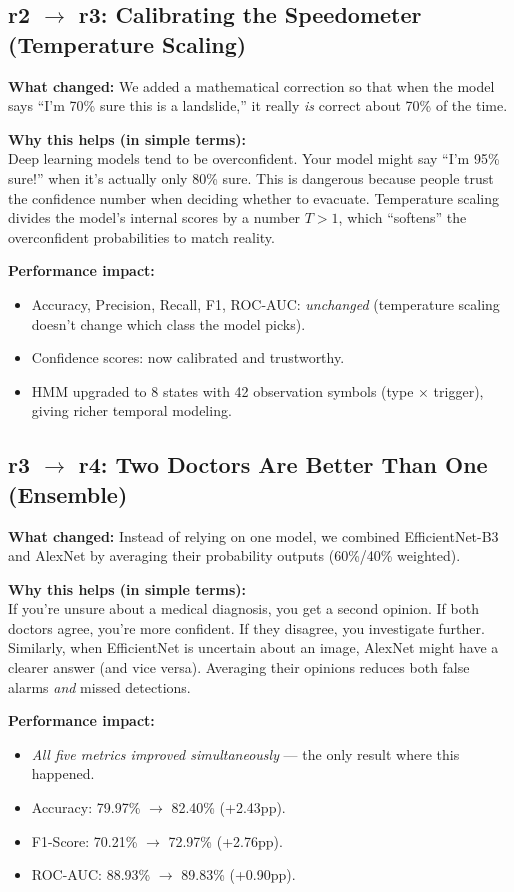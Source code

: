 \documentclass[11pt]{article}
\begin{document}
\subsection{r2 $\to$ r3: Calibrating the Speedometer (Temperature Scaling)}

\textbf{What changed:} We added a mathematical correction so that when the model says ``I'm 70\% sure this is a landslide,'' it really \emph{is} correct about 70\% of the time.

\textbf{Why this helps (in simple terms):}\\
Deep learning models tend to be overconfident. Your model might say ``I'm 95\% sure!'' when it's actually only 80\% sure. This is dangerous because people trust the confidence number when deciding whether to evacuate. Temperature scaling divides the model's internal scores by a number $T > 1$, which ``softens'' the overconfident probabilities to match reality.

\textbf{Performance impact:}
\begin{itemize}[nosep]
    \item Accuracy, Precision, Recall, F1, ROC-AUC: \emph{unchanged} (temperature scaling doesn't change which class the model picks).
    \item Confidence scores: now calibrated and trustworthy.
    \item HMM upgraded to 8 states with 42 observation symbols (type $\times$ trigger), giving richer temporal modeling.
\end{itemize}

\subsection{r3 $\to$ r4: Two Doctors Are Better Than One (Ensemble)}

\textbf{What changed:} Instead of relying on one model, we combined EfficientNet-B3 and AlexNet by averaging their probability outputs (60\%/40\% weighted).

\textbf{Why this helps (in simple terms):}\\
If you're unsure about a medical diagnosis, you get a second opinion. If both doctors agree, you're more confident. If they disagree, you investigate further. Similarly, when EfficientNet is uncertain about an image, AlexNet might have a clearer answer (and vice versa). Averaging their opinions reduces both false alarms \emph{and} missed detections.

\textbf{Performance impact:}
\begin{itemize}[nosep]
    \item \emph{All five metrics improved simultaneously} --- the only result where this happened.
    \item Accuracy: 79.97\% $\to$ 82.40\% (+2.43pp).
    \item F1-Score: 70.21\% $\to$ 72.97\% (+2.76pp).
    \item ROC-AUC: 88.93\% $\to$ 89.83\% (+0.90pp).
\end{itemize}
\end{document}
